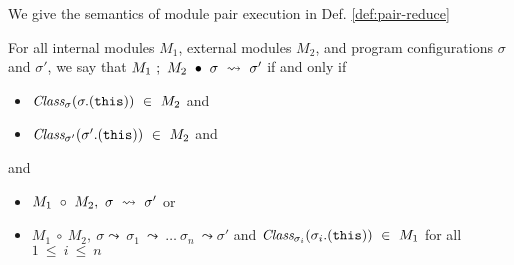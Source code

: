 We give the semantics of module pair execution in Def. \ref{def:pair-reduce}
\begin{definition}
\label{def:pair-reduce}
For all internal modules $M_1$, external modules $M_2$, and program configurations $\sigma$ and $\sigma'$, 
we say that $M_1\ ;\ M_2\ \bullet\ \sigma\ \leadsto\ \sigma'$ if and only if
\begin{itemize}
\item
$\class{\sigma}{\sigma.(\texttt{this})}\ \in\ M_2$ and
\item
$\class{\sigma'}{\sigma'.(\texttt{this})}\ \in\ M_2$ and 
\end{itemize} 
and
\begin{itemize}
\item
$\exec{M_1\ \circ\ M_2}{\sigma}{\sigma'}$ or
\item
$M_1\ \circ\ M_2,\ \sigma \leadsto\ \sigma_1\ \leadsto\ \ldots\ \sigma_n\ \leadsto \sigma'$ and $\class{\sigma_i}{\sigma_i.(\texttt{this})}\ \in\ M_1$ for all $1\ \leq\ i\ \leq\ n$
\end{itemize}
\end{definition}

